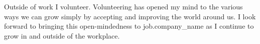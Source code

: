 Outside of work I volunteer. Volunteering has opened my mind to the various ways we can grow simply by accepting and improving the world around us. I look forward to bringing this open-mindedness to {{job.company_name}} as I continue to grow in and outside of the workplace.
